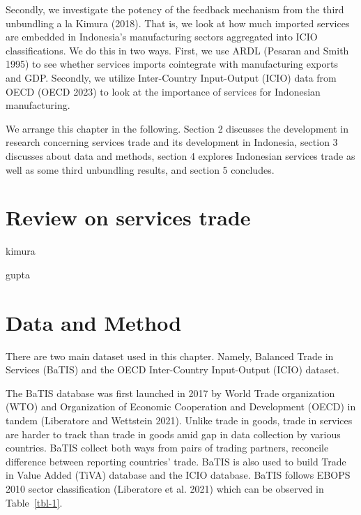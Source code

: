 \documentclass[
  a4paper,
  DIV=11,
  numbers=noendperiod]{scrreprt}
\begin{document}
Secondly, we investigate the potency of the feedback mechanism from the
third unbundling a la Kimura (2018). That is, we look at how much
imported services are embedded in Indonesia's manufacturing sectors
aggregated into ICIO classifications. We do this in two ways. First, we
use ARDL (Pesaran and Smith 1995) to see whether services imports
cointegrate with manufacturing exports and GDP. Secondly, we utilize
Inter-Country Input-Output (ICIO) data from OECD (OECD 2023) to look at
the importance of services for Indonesian manufacturing.

We arrange this chapter in the following. Section 2 discusses the
development in research concerning services trade and its development in
Indonesia, section 3 discusses about data and methods, section 4
explores Indonesian services trade as well as some third unbundling
results, and section 5 concludes.

\section{Review on services trade}\label{review-on-services-trade}

kimura

gupta

\section{Data and Method}\label{data-and-method}

There are two main dataset used in this chapter. Namely, Balanced Trade
in Services (BaTIS) and the OECD Inter-Country Input-Output (ICIO)
dataset.

The BaTIS database was first launched in 2017 by World Trade
organization (WTO) and Organization of Economic Cooperation and
Development (OECD) in tandem (Liberatore and Wettstein 2021). Unlike
trade in goods, trade in services are harder to track than trade in
goods amid gap in data collection by various countries. BaTIS collect
both ways from pairs of trading partners, reconcile difference between
reporting countries' trade. BaTIS is also used to build Trade in Value
Added (TiVA) database and the ICIO database. BaTIS follows EBOPS 2010
sector classification (Liberatore et al. 2021) which can be observed in
Table~\ref{tbl-1}.
\end{document}
